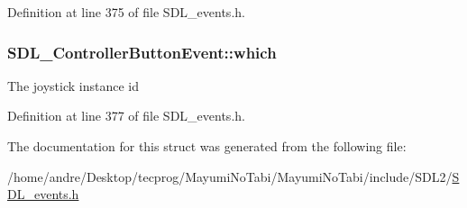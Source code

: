 Definition at line 375 of file S\-D\-L\-\_\-events.\-h.

\hypertarget{struct_s_d_l___controller_button_event_a98777e88b5d5cae83eef16ffd4bcacc1}{
\subsubsection[{which}]{ S\-D\-L\-\_\-\-Controller\-Button\-Event\-::which}}\label{struct_s_d_l___controller_button_event_a98777e88b5d5cae83eef16ffd4bcacc1}
The joystick instance id 

Definition at line 377 of file S\-D\-L\-\_\-events.\-h.



The documentation for this struct was generated from the following file\-:\begin{DoxyCompactItemize}
\item 
/home/andre/\-Desktop/tecprog/\-Mayumi\-No\-Tabi/\-Mayumi\-No\-Tabi/include/\-S\-D\-L2/\hyperlink{_s_d_l__events_8h}{S\-D\-L\-\_\-events.\-h}\end{DoxyCompactItemize}
